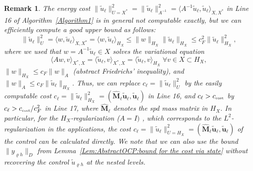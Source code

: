 \documentclass{article}
\newcommand{\norm}[1]{\|#1\|}
\newtheorem{remark}{Remark}
\numberwithin{equation}{section}
\begin{document}
\begin{remark}
  The energy cost $\|\widetilde{u}_\ell\|_{U=X^*}^2 =
  \|\widetilde{u}_\ell\|_{A^{-1}}^2  =
  \langle A^{-1} \widetilde{u}_\ell, \widetilde{u}_\ell\rangle_{X,X^*}$ 
  in Line 16 of Algorithm~\ref{Algorithm1} is in general not computable
  exactly, but we can efficiently compute a good upper bound as follows:
  \begin{equation}\label{Eqn:AbstractOCP:ComputableControlCost}
    \|\widetilde{u}_\ell\|_U^2 =
    \langle w, \widetilde{u}_\ell\rangle_{X,X^*} =
    \langle w, \widetilde{u}_\ell\rangle_{H_X} \le
    \|w\|_{H_X}\|\widetilde{u}_\ell\|_{H_X} \le
    c_F^2 \|\widetilde{u}_\ell\|_{H_X}^2,
  \end{equation}
  where we used that $w = A^{-1} \widetilde{u}_\ell \in X$ solves the
  variational equation
  \begin{equation*}
    \langle A w, v \rangle_{X^*,X} =
    \langle \widetilde{u}_\ell, v\rangle_{X^*,X} =
    \langle \widetilde{u}_\ell,v\rangle_{H_X} \; \forall v \in X \subset H_X,  
  \end{equation*}
  $ \|w\|_{H_X} \le c_F  \|w\|_A$ (abstract Friedrichs' inequality),
  and $\|w\|_A \le c_F \|\widetilde{u}_\ell\|_{H_X}$. Thus, we can replace 
  $c_\ell = \|\widetilde{u}_\ell\|_U^2$ by the easily computable cost
  $c_\ell = \|\widetilde{u}_\ell\|_{H_X}^2 =
  (\widehat{\mathbf{M}}_\ell \widetilde{\mathbf{u}}_\ell,
  \widetilde{\mathbf{u}}_\ell )$ in Line 16, and
  $c_\ell > c_\text{\tiny cost}$ by $c_\ell > c_\text{\tiny cost} / c_F^2$
 in Line 17, where $\widehat{\mathbf{M}}_\ell $ denotes the spd mass
  matrix in $H_X$. In particular, for the $H_X$-regularization ($A = I)$ ,
  which corresponds to the $L^2$-regularization in the applications,
  the cost $c_\ell = \|\widetilde{u}_\ell\|_{U=H_X}^2 = (\widehat{\mathbf{M}}_\ell \widetilde{\mathbf{u}}_\ell,
  \widetilde{\mathbf{u}}_\ell)$ of the control can 
  be calculated  directly. 
  We note that we can also use the bound $\norm{y_{\varrho h}}_{D}$
  from Lemma~\ref{Lem:AbstractOCP:bound for the cost via state}
  without recovering the control $\widetilde{u}_{\varrho h}$ at the nested 
  levels.
\end{remark}


 
\end{document}
